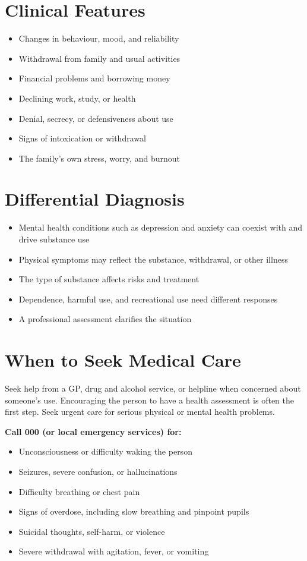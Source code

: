 \section*{Clinical Features}
\begin{itemize}
    \item Changes in behaviour, mood, and reliability
    \item Withdrawal from family and usual activities
    \item Financial problems and borrowing money
    \item Declining work, study, or health
    \item Denial, secrecy, or defensiveness about use
    \item Signs of intoxication or withdrawal
    \item The family's own stress, worry, and burnout
\end{itemize}

\section*{Differential Diagnosis}
\begin{itemize}
    \item Mental health conditions such as depression and anxiety can coexist with and drive substance use
    \item Physical symptoms may reflect the substance, withdrawal, or other illness
    \item The type of substance affects risks and treatment
    \item Dependence, harmful use, and recreational use need different responses
    \item A professional assessment clarifies the situation
\end{itemize}

\section*{When to Seek Medical Care}
Seek help from a GP, drug and alcohol service, or helpline when concerned about someone's use. Encouraging the person to have a health assessment is often the first step. Seek urgent care for serious physical or mental health problems.

\textbf{Call 000 (or local emergency services) for:}
\begin{itemize}
    \item Unconsciousness or difficulty waking the person
    \item Seizures, severe confusion, or hallucinations
    \item Difficulty breathing or chest pain
    \item Signs of overdose, including slow breathing and pinpoint pupils
    \item Suicidal thoughts, self-harm, or violence
    \item Severe withdrawal with agitation, fever, or vomiting
\end{itemize}

